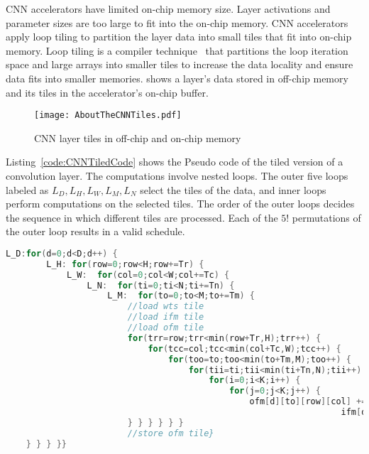 CNN accelerators have limited on-chip memory size. Layer activations and parameter sizes are too large to fit into the on-chip memory. CNN accelerators apply loop tiling to partition the layer data into small tiles that fit into on-chip memory. Loop tiling is a compiler  technique~\cite{aho2006compilers} that partitions the loop iteration space and large arrays into smaller tiles to increase the data locality and ensure data fits into smaller memories.  shows a layer's data stored in off-chip memory and its tiles in the accelerator's on-chip buffer.
\begin{figure}[!htb]
	\centering
	\captionsetup{font=sf}	
	\texttt{[image: AboutTheCNNTiles.pdf]}
	\caption{CNN layer tiles in off-chip and on-chip memory}
	\label{fig:partitioningDataUsingTiling}
\end{figure}

Listing~\ref{code:CNNTiledCode} shows the Pseudo code of the tiled version of a convolution layer. The computations involve nested loops. The outer five loops labeled as $L_D,L_H,L_W,L_M,L_N$ select the tiles of the data, and inner loops perform computations on the selected tiles. The order of the outer loops decides the sequence in which different tiles are processed. Each of the $5!$ permutations of the outer loop results in a valid schedule. 
\begin{lstlisting}[float,language=C,label=code:CNNTiledCode,caption=Pseudo code of a tiled convolution layer,captionpos=b,belowskip=-1 \baselineskip,breakautoindent=true, breakindent=108pt, breaklines]
	L_D:for(d=0;d<D;d++) {
		L_H: for(row=0;row<H;row+=Tr) {
			L_W:  for(col=0;col<W;col+=Tc) {
				L_N:  for(ti=0;ti<N;ti+=Tn) {
					L_M:  for(to=0;to<M;to+=Tm) {
						//load wts tile
						//load ifm tile
						//load ofm tile
						for(trr=row;trr<min(row+Tr,H);trr++) {
							for(tcc=col;tcc<min(col+Tc,W);tcc++) {
								for(too=to;too<min(to+Tm,M);too++) {
									for(tii=ti;tii<min(ti+Tn,N);tii++) {
										for(i=0;i<K;i++) {
											for(j=0;j<K;j++) {
												ofm[d][to][row][col] += weights[to][ti][i][j] * 
												                  ifm[d][ti][S*row+i][S*col+j];
						} } } } } }
						//store ofm tile}
	} } } }}
\end{lstlisting}

